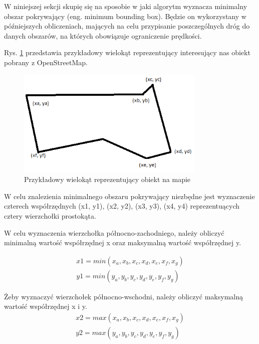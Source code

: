 W niniejszej sekcji skupię się na sposobie w jaki algorytm wyznacza minimalny obszar pokrywający (eng. minimum bounding box). Będzie on wykorzystany w późniejszych obliczeniach, mających na celu przypisanie poszczególnych dróg do danych obszarów, na których obowiązuje ograniczenie prędkości.

Rys. \ref{sec:minBoundingBoxFirst} przedstawia przykładowy wielokąt reprezentujący interesujący nas obiekt pobrany z OpenStreetMap.

\begin{figure}[h]
\caption{Przykładowy wielokąt reprezentujący obiekt na mapie}
\label{sec:minBoundingBoxFirst}
\centering
\includegraphics[width=0.8\textwidth]{minBoundingBoxFirst}
\end{figure}

W celu znalezienia minimalnego obszaru pokrywający niezbędne jest wyznaczenie czterech współrzędnych (x1, y1), (x2, y2), (x3, y3), (x4, y4) reprezentuących cztery wierzchołki prostokąta.

W celu wyznaczenia wierzchołka północno-zachodniego, należy obliczyć minimalną wartość współrzędnej x oraz maksymalną wartość współrzędnej y.

\begin{equation} \label{sec:drugiWierzcholek}
\begin{split}
x1 = min(x_a, x_b, x_c, x_d, x_e, x_f, x_g) \\
y1 = min(y_a, y_b, y_c, y_d, y_e, y_f, y_g)
\end{split}
\end{equation}\newline

Żeby wyznaczyć wierzchołek północno-wschodni, należy obliczyć maksymalną wartość współrzędnej x i y.
\begin{equation} \label{sec:trzeciWierzcholek}
\begin{split}
x2 = max(x_a, x_b, x_c, x_d, x_e, x_f, x_g)  \\
y2 = max(y_a, y_b, y_c, y_d, y_e, y_f, y_g)
\end{split}
\end{equation}\newline

